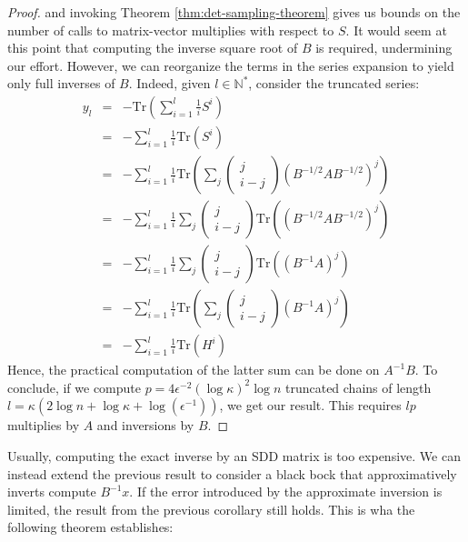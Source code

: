 \begin{proof}
and invoking Theorem \ref{thm:det-sampling-theorem} gives us bounds
on the number of calls to matrix-vector multiplies with respect to
$S$. It would seem at this point that computing the inverse square
root of $B$ is required, undermining our effort. However, we can
reorganize the terms in the series expansion to yield only full inverses
of $B$. Indeed, given $l\in\mathbb{N}^{*}$, consider the truncated
series: 
\begin{eqnarray*}
y_{l} & = & -\mbox{Tr}\left(\sum_{i=1}^{l}\frac{1}{i}S^{i}\right)\\
 & = & -\sum_{i=1}^{l}\frac{1}{i}\mbox{Tr}\left(S^{i}\right)\\
 & = & -\sum_{i=1}^{l}\frac{1}{i}\mbox{Tr}\left(\sum_{j}\left(\begin{array}{c}
j\\
i-j
\end{array}\right)\left(B^{-1/2}AB^{-1/2}\right)^{j}\right)\\
 & = & -\sum_{i=1}^{l}\frac{1}{i}\sum_{j}\left(\begin{array}{c}
j\\
i-j
\end{array}\right)\mbox{Tr}\left(\left(B^{-1/2}AB^{-1/2}\right)^{j}\right)\\
 & = & -\sum_{i=1}^{l}\frac{1}{i}\sum_{j}\left(\begin{array}{c}
j\\
i-j
\end{array}\right)\mbox{Tr}\left(\left(B^{-1}A\right)^{j}\right)\\
 & = & -\sum_{i=1}^{l}\frac{1}{i}\mbox{Tr}\left(\sum_{j}\left(\begin{array}{c}
j\\
i-j
\end{array}\right)\left(B^{-1}A\right)^{j}\right)\\
 & = & -\sum_{i=1}^{l}\frac{1}{i}\mbox{Tr}\left(H^{i}\right)
\end{eqnarray*}
Hence, the practical computation of the latter sum can be done on
$A^{-1}B$. To conclude, if we compute $p=4\epsilon^{-2}\left(\log\kappa\right)^{2}\log n$
truncated chains of length $l=\kappa\left(2\log n+\log\kappa+\log\left(\epsilon^{-1}\right)\right)$,
we get our result. This requires $lp$ multiplies by $A$ and inversions
by $B$. \end{proof} 

Usually, computing the exact inverse by an SDD matrix is too expensive.
We can instead extend the previous result to consider a black bock
that approximatively inverts compute $B^{-1}x$. If the error introduced
by the approximate inversion is limited, the result from the previous
corollary still holds. This is wha the following theorem establishes:

